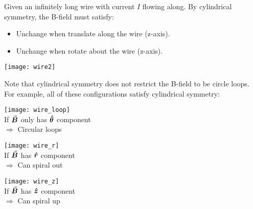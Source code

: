 \documentclass[class=article, crop=false, 12pt]{standalone}
\begin{document}
\begin{example}
    Given an infinitely long wire with current $I$ flowing along.
    By cylindrical symmetry, the B-field must satisfy:

    \begin{minipage}{0.6\linewidth}
        \begin{itemize}
            \item Unchange when translate along the wire (z-axis).
            \item Unchange when rotate about the wire (z-axis).
        \end{itemize}
    \end{minipage}
    \begin{minipage}{0.15\linewidth}
        \centering
        \texttt{[image: wire2]}
    \end{minipage}

    
    Note that cylindrical symmetry does not restrict the B-field to be circle loops.
    For example, all of these configurations satisfy cylindrical symmetry:

    \begin{center}
        \begin{minipage}{0.3\linewidth}
            \centering
            \texttt{[image: wire\_loop]}\\
            If $\va*{B}$ only has $\vu*{\theta}$ component\\
            $\Rightarrow$ Circular loops
        \end{minipage}
        \hspace{0.01\textwidth}
        \begin{minipage}{0.25\linewidth}
            \centering
            \texttt{[image: wire\_r]}\\
            If $\va*{B}$ has $\vu*{r}$ component\\
            $\Rightarrow$ Can spiral out
        \end{minipage}
        \hspace{0.01\textwidth}
        \begin{minipage}{0.25\linewidth}
            \centering
            \texttt{[image: wire\_z]}\\
            If $\va*{B}$ has $\vu*{z}$ component\\
            $\Rightarrow$ Can spiral up
        \end{minipage}
    \end{center}


\end{example}
\end{document}
